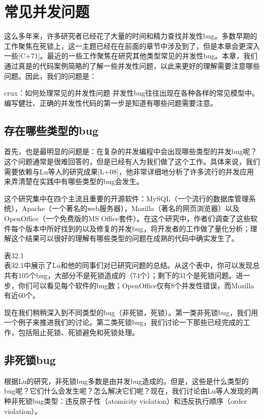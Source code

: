 \chapter{常见并发问题}
\thispagestyle{empty}
这么多年来，许多研究者已经花了大量的时间和精力查找并发性bug。多数早期的工作聚焦在死锁上，这一主题已经在在前面的章节中涉及到了，但是本章会更深入一些[C+71]。最近的一些工作聚焦在研究其他类型常见的并发性bug。本章，我们通过真是的代码案例简略的了解一些并发性问题，以此来更好的理解需要注意哪些问题。因此，我们的问题是：

crux：如何处理常见的并发性问题
并发性bug往往出现在各种各样的常见模型中。编写健壮、正确的并发性代码的第一步是知道有哪些问题需要注意。


\section{存在哪些类型的bug}
首先，也是最明显的问题是：在复杂的并发编程中会出现哪些类型的并发bug呢？这个问题通常是很难回答的，但是已经有人为我们做了这个工作。具体来说，我们需要依赖与Lu等人的研究成果[L+08]，他非常详细地分析了许多流行的并发应用来弄清楚在实践中有哪些类型的bug会发生。

这个研究集中在四个主流且重要的开源软件：MySQL（一个流行的数据库管理系统），Apache（一个著名的web服务器），Mozilla（著名的网页浏览器）以及OpenOffice（一个免费版的MS Office套件）。在这个研究中，作者们调查了这些软件每个版本中所好找到的以及修复的并发bug，将开发者的工作做了量化分析；理解这个结果可以很好的理解有哪些类型的问题在成熟的代码中确实发生了。

表32.1\\

表32.1中展示了Lu和他的同事们对已研究问题的总结。从这个表中，你可以发现总共有105个bug，大部分不是死锁造成的（74个）；剩下的31个是死锁问题。进一步，你们可以看见每个软件的bug数；OpenOffice仅有8个并发性错误，而Mozilla有近60个。

现在我们稍稍深入到不同类型的bug（非死锁，死锁）。第一类非死锁bug，我们用一个例子来推进我们的讨论。第二类死锁bug，我们讨论一下那些已经完成的工作，包括阻止死锁、死锁避免和死锁处理。


\section{非死锁bug}
根据Lu的研究，非死锁bug多数是由并发bug造成的。但是，这些是什么类型的bug呢？它们什么会发生呢？怎么解决它们呢？现在，我们讨论由Lu等人发现的两种非死锁bug类型：违反原子性（atomicity violation）和违反执行顺序（order violation）。

